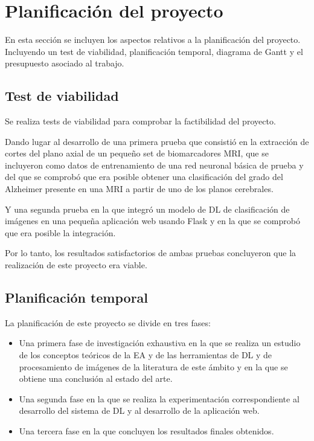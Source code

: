\chapter{Planificación del proyecto}\label{ch:planificacion}
En esta sección se incluyen los aspectos relativos a la planificación del proyecto.
Incluyendo un test de viabilidad, planificación temporal, diagrama de Gantt y el presupuesto asociado al
trabajo.


\section{Test de viabilidad}\label{sec:test-de-viabilidad}
Se realiza tests de viabilidad para comprobar la factibilidad del proyecto.

Dando lugar al desarrollo de una primera prueba que consistió en la extracción de cortes del plano axial de un pequeño
set de biomarcadores MRI, que se incluyeron como datos de entrenamiento de una red neuronal básica de prueba y del que
se comprobó que era posible obtener una clasificación del grado del Alzheimer presente en una MRI a partir de uno de
los planos cerebrales.

Y una segunda prueba en la que integró un modelo de DL de clasificación de imágenes en una pequeña aplicación web
usando Flask y en la que se comprobó que era posible la integración.

Por lo tanto, los resultados satisfactorios de ambas pruebas concluyeron que la realización de este proyecto era viable.


\section{Planificación temporal}\label{sec:planificacion-temporal}
La planificación de este proyecto se divide en tres fases:
\begin{itemize}
    \item Una primera fase de investigación exhaustiva en la que se realiza un estudio de los conceptos teóricos de la
    EA y de las herramientas de DL y de procesamiento de imágenes de la literatura de este ámbito y en la que se obtiene
    una conclusión al estado del arte.
    \item Una segunda fase en la que se realiza la experimentación correspondiente al desarrollo del sistema de DL y al
    desarrollo de la aplicación web.
    \item Una tercera fase en la que concluyen los resultados finales obtenidos. \\
\end{itemize}

